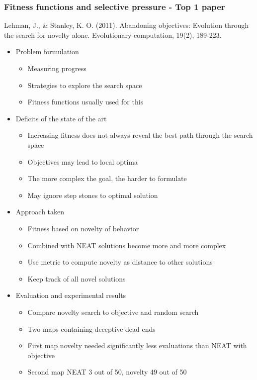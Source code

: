 \documentclass[8pt]{beamer}
\begin{document}
\begin{frame}
\frametitle{Fitness functions and selective pressure - Top 1 paper}
Lehman, J., \& Stanley, K. O. (2011). Abandoning objectives: Evolution through the search for novelty alone. Evolutionary computation, 19(2), 189-223.
\begin{itemize}
	\item Problem formulation
	\begin{itemize}
		\item Measuring progress
		\item Strategies to explore the search space
		\item Fitness functions usually used for this
	\end{itemize}
	\item Deficits of the state of the art
	\begin{itemize}
		\item Increasing fitness does not always reveal the best path through the search space		
		\item Objectives may lead to local optima
		\item The more complex the goal, the harder to formulate
		\item May ignore step stones to optimal solution
	\end{itemize}		 
	\item Approach taken
	\begin{itemize}
		\item Fitness based on novelty of behavior
		\item Combined with NEAT solutions become more and more complex
		\item Use metric to compute novelty as distance to other solutions
		\item Keep track of all novel solutions
	\end{itemize}
	\item Evaluation and experimental results
	\begin{itemize}
		\item Compare novelty search to objective and random search
		\item Two maps containing deceptive dead ends
		\item First map novelty needed significantly less evaluations than NEAT with objective
		\item Second map NEAT 3 out of 50, novelty 49 out of 50
	\end{itemize}
\end{itemize}
\end{frame}
\end{document}
